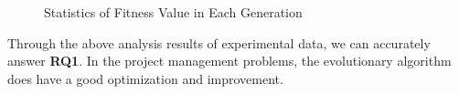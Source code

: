 \begin{figure}[ht]
  \centering
  \caption{Statistics of Fitness Value in Each Generation}
  \label{fig:pj}
\end{figure}


Through the above analysis results of experimental data, we can accurately
answer \textbf{RQ1}. In the project management problems, the evolutionary
algorithm does have a good optimization and improvement.


